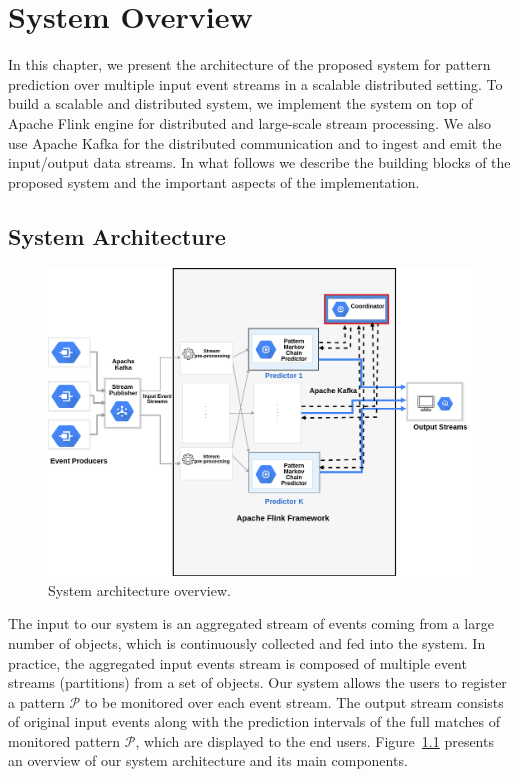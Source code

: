 

\chapter{System Overview}
\label{chapter:overview}
\par In this chapter, we present the architecture of the proposed system for pattern prediction over multiple input event streams in a scalable distributed setting. To build a scalable and distributed system, we implement the system on top of Apache Flink engine for distributed and large-scale stream processing. We also use Apache Kafka for the distributed communication and to ingest and emit the input/output data streams. In what follows we describe the building blocks of the proposed system and the important aspects of the implementation.

\section{System Architecture}
\label{sec:architecture}

\begin{figure}[H]
	\centering
	\includegraphics[width=\textwidth,keepaspectratio]{chapters/figures/system_v2.png}
	
	\caption{System architecture overview.}
	\label{fig:architecture}
\end{figure}

The input to our system is an aggregated stream of events coming from a large number of  objects, which is continuously collected and fed into the system. In practice, the aggregated input events stream is composed of multiple event streams (partitions) from a set of objects. Our system allows the users to register a pattern $\mathcal{P}$ to be monitored over each event stream. The output stream consists of original input events along with  the prediction intervals of the full matches of monitored pattern $\mathcal{P}$, which are displayed to the end users. Figure~\ref{fig:architecture} presents an overview of our system architecture and its main components.      


